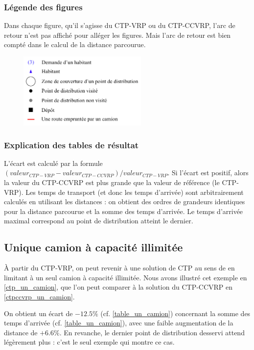 \documentclass[5p,authoryear,square]{elsarticle}
\begin{document}
\subsubsection{Légende des figures}
Dans chaque figure, qu'il s'agisse du CTP-VRP ou du CTP-CCVRP, l'arc de retour n'est pas affiché pour alléger les figures. Mais l'arc de retour est bien compté dans le calcul de la distance parcourue. 
\begin{figure}[ht]
	\includegraphics[width=2.5in]{figures/legende}
\end{figure}
\subsubsection{Explication des tables de résultat}
L'écart est calculé par la formule $(valeur_{CTP-VRP}-valeur_{CTP-CCVRP}) / valeur_{CTP-VRP}$. Si l'écart est positif, alors la valeur du CTP-CCVRP est plus grande que la valeur de référence (le CTP-VRP).
Les temps de transport (et donc les temps d'arrivée) sont arbitrairement calculés en utilisant les distances : on obtient des ordres de grandeurs identiques pour la distance parcourue et la somme des temps d'arrivée. Le temps d'arrivée maximal correspond au point de distribution atteint le dernier.
%
%

\subsection{Unique camion à capacité illimitée}
À partir du CTP-VRP, on peut revenir à une solution de CTP au sens de \citeauthor{gendreau_covering_1997} en limitant à un seul camion à capacité illimitée. Nous avons illustré cet exemple en \cref{ctp_un_camion}, que l'on peut comparer à la solution du CTP-CCVRP en \cref{ctpccvrp_un_camion}.

On obtient un écart de $-12.5\%$ (cf. \cref{table_un_camion}) concernant la somme des temps d'arrivée (cf. \cref{table_un_camion}), avec une faible augmentation de la distance de $+6.6\%$. En revanche, le dernier point de distribution desservi attend légèrement plus : c'est le seul exemple qui montre ce cas.
\end{document}
